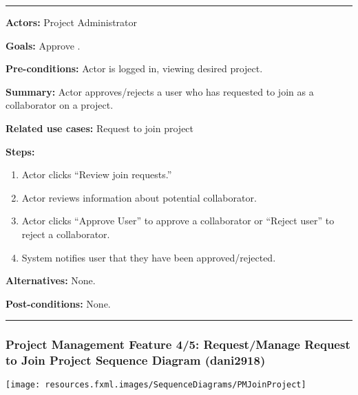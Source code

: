 \documentclass[twoside,letterpaper]{article}
\begin{document}
\vspace{2pt}
\hrule
\vspace{8pt}
\noindent \textbf{Actors:} Project Administrator \newline
 
\noindent \textbf{Goals:} Approve . \newline

\noindent \textbf{Pre-conditions:} Actor is logged in, viewing desired project.  \newline

\noindent \textbf{Summary:} Actor approves/rejects a user who has requested to join as a collaborator on a project.\newline

\noindent \textbf{Related use cases:} Request to join project \newline

\noindent \textbf{Steps:} \begin{enumerate}
  \item Actor clicks ``Review join requests.''
  \item Actor reviews information about potential collaborator.
  \item Actor clicks ``Approve User'' to approve a collaborator or ``Reject user'' to reject a collaborator.
  \item System notifies user that they have been approved/rejected.
 \end{enumerate}
 \textbf{Alternatives:} None. \newline
 
 \noindent  \textbf{Post-conditions:} None. \newline
 \noindent
\vspace{8pt}
\hrule

\newpage

\subsubsection[Project Management Feature 4/5: Request/Manage Request to Join Project Sequence Diagram  (dani2918)]{\rmfamily\bfseries\color{black}
	Project Management Feature 4/5: Request/Manage Request to Join Project Sequence Diagram (dani2918)}

\bigskip

\texttt{[image: resources.fxml.images/SequenceDiagrams/PMJoinProject]}
\label{pm:sd6}

\newpage
\end{document}
